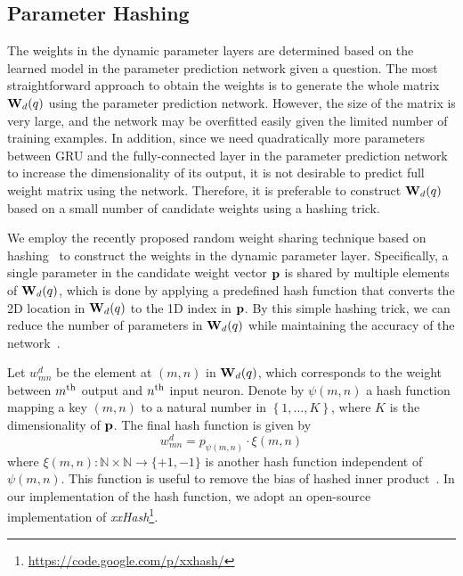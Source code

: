 \documentclass[10pt,twocolumn,letterpaper]{article}
\begin{document}
\subsection{Parameter Hashing}
\label{sub:hashing}



The weights in the dynamic parameter layers are determined based on the learned model in the parameter prediction network given a question.
The most straightforward approach to obtain the weights is to generate the whole matrix ${\bf{W}}_{d}(q)$ using the parameter prediction network.
However, the size of the matrix is very large, and the network may be overfitted easily given the limited number of training examples.
In addition, since we need quadratically more parameters between GRU and the fully-connected layer in the parameter prediction network to increase the dimensionality of its output, it is not desirable to predict full weight matrix using the network.
Therefore, it is preferable to construct ${\bf{W}}_{d}(q)$ based on a small number of candidate weights using a hashing trick.





We employ the recently proposed random weight sharing technique based on hashing~\cite{Hashing} to construct the weights in the dynamic parameter layer. 
Specifically, a single parameter in the candidate weight vector ${\bf{p}}$ is shared by multiple elements of ${\bf{W}}_{d}(q)$, which is done by applying a predefined hash function that converts the 2D location in ${\bf{W}}_{d}(q)$ to the 1D index in ${\bf{p}}$.
By this simple hashing trick, we can reduce the number of parameters in ${\bf{W}}_{d}(q)$ while maintaining the accuracy of the network~\cite{Hashing}.




Let $w^{d}_{mn}$ be the element at $(m,n)$ in ${\bf{W}}_{d}(q)$, which corresponds to the weight between $m^{\rm th}$ output and $n^{\rm th}$ input neuron. 
Denote by $\psi(m,n)$ a hash function mapping a key $(m,n)$ to a natural number in $\left\{1,\dots,K \right\}$, where $K$ is the dimensionality of ${\bf p}$.
The final hash function is given by
\begin{equation}
w^{d}_{mn}={p}_{\psi(m,n)} \cdot \xi(m,n)
\end{equation}
where $\xi(m,n):\mathbb{N}\times\mathbb{N}\rightarrow \{+1, -1 \}$ is another hash function independent of $\psi(m,n)$.
This function is useful to remove the bias of hashed inner product~\cite{Hashing}.
In our implementation of the hash function, we adopt an open-source implementation of {\it{xxHash}}\footnote{\url{https://code.google.com/p/xxhash/}}.
\end{document}

